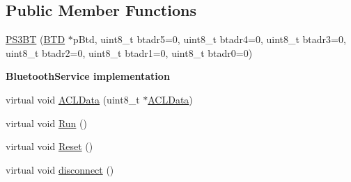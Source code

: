 \subsection*{\-Public \-Member \-Functions}
\begin{DoxyCompactItemize}
\item 
\hyperlink{class_p_s3_b_t_aab14832f7844f07e6287eb443019b6e7}{\-P\-S3\-B\-T} (\hyperlink{class_b_t_d}{\-B\-T\-D} $\ast$p\-Btd, uint8\-\_\-t btadr5=0, uint8\-\_\-t btadr4=0, uint8\-\_\-t btadr3=0, uint8\-\_\-t btadr2=0, uint8\-\_\-t btadr1=0, uint8\-\_\-t btadr0=0)
\end{DoxyCompactItemize}
\begin{Indent}{\bf \-Bluetooth\-Service implementation}\par
\begin{DoxyCompactItemize}
\item 
virtual void \hyperlink{class_p_s3_b_t_aa310ede24b68b1b03cfc49c4308c66b7}{\-A\-C\-L\-Data} (uint8\-\_\-t $\ast$\hyperlink{class_p_s3_b_t_aa310ede24b68b1b03cfc49c4308c66b7}{\-A\-C\-L\-Data})
\item 
virtual void \hyperlink{class_p_s3_b_t_ab41f25f45573239990f68611dc825086}{\-Run} ()
\item 
virtual void \hyperlink{class_p_s3_b_t_a576d72cdf12af58ae59c8f2a02f99c0f}{\-Reset} ()
\item 
virtual void \hyperlink{class_p_s3_b_t_a39ad8810c67e85eddc68c8a16d38a985}{disconnect} ()
\end{DoxyCompactItemize}
\end{Indent}
